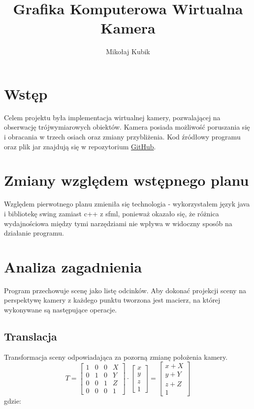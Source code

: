 \documentclass[11pt]{article}
\title{Grafika Komputerowa Wirtualna Kamera}
\author{Mikołaj Kubik}
\begin{document}
\maketitle
\section{Wstęp}
Celem projektu była implementacja wirtualnej kamery, pozwalającej na 
obserwację trójwymiarowych obiektów. Kamera posiada możliwość poruszania się 
i obracania w trzech osiach oraz zmiany przybliżenia. Kod źródłowy programu oraz plik jar znajdują się w repozytorium \href{https://github.com/MikolajKubek/swing-virtual-camera}{\color{blue}GitHub}.
\section{Zmiany względem wstępnego planu}
Względem pierwotnego planu zmieniła się technologia - wykorzystałem
język java i bibliotekę swing zamiast c++ z sfml, ponieważ okazało się, 
że różnica wydajnościowa między tymi narzędziami nie wpływa w widoczny sposób na działanie programu.
\section{Analiza zagadnienia}
Program przechowuje scenę jako listę odcinków. Aby dokonać projekcji 
sceny na perspektywę kamery z każdego punktu tworzona jest macierz, na której wykonywane są następujące operacje.
\subsection{Translacja}
Transformacja sceny odpowiadająca za pozorną zmianę położenia kamery.
\begin{equation}
    T =
    \begin{bmatrix}
        1 & 0 & 0 & X\\
        0 & 1 & 0 & Y\\
        0 & 0 & 1 & Z\\
        0 & 0 & 0 & 1
    \end{bmatrix}
    \cdot
    \begin{bmatrix}
        x\\
        y\\
        z\\
        1
    \end{bmatrix}
    =
    \begin{bmatrix}
        x + X\\
        y + Y\\
        z + Z\\
        1
    \end{bmatrix}
\end{equation}
gdzie:
\end{document}
